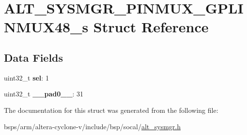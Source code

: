\hypertarget{structALT__SYSMGR__PINMUX__GPLINMUX48__s}{}\section{A\+L\+T\+\_\+\+S\+Y\+S\+M\+G\+R\+\_\+\+P\+I\+N\+M\+U\+X\+\_\+\+G\+P\+L\+I\+N\+M\+U\+X48\+\_\+s Struct Reference}
\label{structALT__SYSMGR__PINMUX__GPLINMUX48__s}
\subsection*{Data Fields}
\begin{DoxyCompactItemize}
\item 
\mbox{\label{structALT__SYSMGR__PINMUX__GPLINMUX48__s_abc56f4179feec77fc259703e78fc0287}} 
uint32\+\_\+t {\bfseries sel}\+: 1
\item 
\mbox{\label{structALT__SYSMGR__PINMUX__GPLINMUX48__s_a6da86b0a624bba0813452345927185fe}} 
uint32\+\_\+t {\bfseries \+\_\+\+\_\+pad0\+\_\+\+\_\+}\+: 31
\end{DoxyCompactItemize}


The documentation for this struct was generated from the following file\+:\begin{DoxyCompactItemize}
\item 
bsps/arm/altera-\/cyclone-\/v/include/bsp/socal/\mbox{\hyperlink{alt__sysmgr_8h}{alt\+\_\+sysmgr.\+h}}\end{DoxyCompactItemize}
